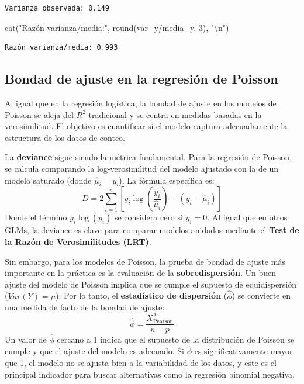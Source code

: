 \documentclass[
  letterpaper,
  DIV=11,
  numbers=noendperiod]{scrreprt}
\newenvironment{Shaded}{\begin{snugshade}}{\end{snugshade}}
\newcommand{\DecValTok}[1]{\textcolor[rgb]{0.68,0.00,0.00}{#1}}
\newcommand{\FunctionTok}[1]{\textcolor[rgb]{0.28,0.35,0.67}{#1}}
\newcommand{\NormalTok}[1]{\textcolor[rgb]{0.00,0.23,0.31}{#1}}
\newcommand{\SpecialCharTok}[1]{\textcolor[rgb]{0.37,0.37,0.37}{#1}}
\newcommand{\StringTok}[1]{\textcolor[rgb]{0.13,0.47,0.30}{#1}}
\begin{document}
\begin{tcolorbox}
\begin{verbatim}
Varianza observada: 0.149 
\end{verbatim}

\begin{Shaded}
\begin{Highlighting}[]
\FunctionTok{cat}\NormalTok{(}\StringTok{"Razón varianza/media:"}\NormalTok{, }\FunctionTok{round}\NormalTok{(var\_y}\SpecialCharTok{/}\NormalTok{media\_y, }\DecValTok{3}\NormalTok{), }\StringTok{"}\SpecialCharTok{\textbackslash{}n}\StringTok{"}\NormalTok{)}
\end{Highlighting}
\end{Shaded}

\begin{verbatim}
Razón varianza/media: 0.993 
\end{verbatim}

\end{tcolorbox}

\subsection{Bondad de ajuste en la regresión de
Poisson}\label{bondad-de-ajuste-en-la-regresiuxf3n-de-poisson}

Al igual que en la regresión logística, la bondad de ajuste en los
modelos de Poisson se aleja del \(R^2\) tradicional y se centra en
medidas basadas en la verosimilitud. El objetivo es cuantificar si el
modelo captura adecuadamente la estructura de los datos de conteo.

La \textbf{deviance} sigue siendo la métrica fundamental. Para la
regresión de Poisson, se calcula comparando la log-verosimilitud del
modelo ajustado con la de un modelo saturado (donde
\(\hat{\mu}_i = y_i\)). La fórmula específica es:
\[D = 2 \sum_{i=1}^{n} \left[ y_i \log\left(\frac{y_i}{\hat{\mu}_i}\right) - (y_i - \hat{\mu}_i) \right]\]
Donde el término \(y_i \log(y_i)\) se considera cero si \(y_i = 0\). Al
igual que en otros GLMs, la deviance es clave para comparar modelos
anidados mediante el \textbf{Test de la Razón de Verosimilitudes (LRT)}.

Sin embargo, para los modelos de Poisson, la prueba de bondad de ajuste
más importante en la práctica es la evaluación de la
\textbf{sobredispersión}. Un buen ajuste del modelo de Poisson implica
que se cumple el supuesto de equidispersión (\(Var(Y) = \mu\)). Por lo
tanto, el \textbf{estadístico de dispersión} (\(\hat{\phi}\)) se
convierte en una medida de facto de la bondad de ajuste:
\[\hat{\phi} = \frac{X^2_{\text{Pearson}}}{n-p}\] Un valor de
\(\hat{\phi}\) cercano a 1 indica que el supuesto de la distribución de
Poisson se cumple y que el ajuste del modelo es adecuado. Si
\(\hat{\phi}\) es significativamente mayor que 1, el modelo no se ajusta
bien a la variabilidad de los datos, y este es el principal indicador
para buscar alternativas como la regresión binomial negativa.
\end{document}
